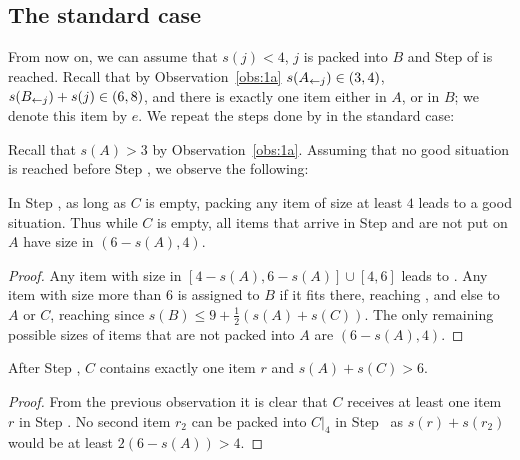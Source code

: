 \subsection{The standard case}
From now on, we can assume that $s(j) < 4$, $j$ is packed into $B$ and
Step  of \tbalg is reached. Recall that by Observation~\ref{obs:1a}
$s(A_{\leftarrow j}) \in  (3,4)$, $s(B_{\leftarrow j}) + s(j) \in(6,8)$, and
there is exactly one item either in $A$, or in $B$; we denote this item by $e$.
We repeat the steps done by \tbalg in the standard case:

\smallskip
{}

Recall that $s(A) > 3$ by Observation~\ref{obs:1a}. Assuming
that no good situation is reached before Step , we
observe the following:


\begin{obs}
\label{obs:6-b}
In Step {\rm {}}, as long as $C$ is empty,
packing any item of size at least $4$ leads to a good
situation. Thus while $C$ is empty, all items that 
arrive in Step {\rm {}} and are not put on $A$ 
have size in $(6-s(A),4)$.
\end{obs}
\begin{proof}
Any item with size in $[4-s(A),6-s(A)]\cup[4,6]$ leads to . 
Any item with size more than 6 is assigned to $B$ if it fits there,
reaching , and else to $A$ or $C$, reaching  since $s(B)\le9+\frac{1}{2}(s(A)+s(C))$. The only remaining
possible sizes of items that are not packed into $A$ are $(6-s(A),4)$.
\end{proof}

\begin{cor}
\label{obs:c}
After Step {\rm {}}, $C$ contains exactly one item $r$ and $s(A)+s(C)>6$.
\end{cor}

\begin{proof}
From the previous observation it is clear that $C$ receives at least one item $r$ in Step . No second
item $r_2$ can be packed into $C|_4$ in Step~ as $s(r) + s(r_2)$ would be at least $2(6 - s(A)) > 4$.
\end{proof}


